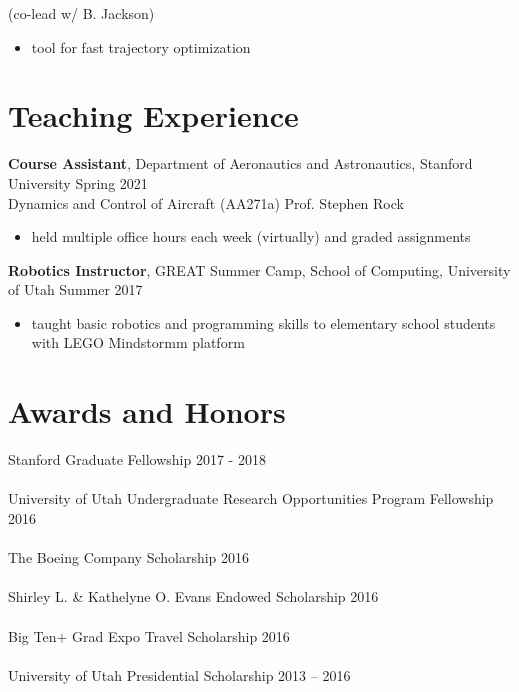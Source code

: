 \documentclass[10pt]{article}
\begin{document}
 (co-lead w/ B. Jackson) 
\begin{itemize}
\item  {\color{lightgray} tool for fast trajectory optimization}
\end{itemize}

\section*{Teaching Experience}
\textbf{Course Assistant}, Department of Aeronautics and Astronautics, Stanford University \hfill Spring 2021\\
{\color{lightgray} Dynamics and Control of Aircraft (AA271a) \hfill Prof. Stephen Rock} 
\begin{itemize}
    \item {\color{lightgray} held multiple office hours each week (virtually) and graded assignments}
\end{itemize}
\textbf{Robotics Instructor}, GREAT Summer Camp, School of Computing, University of Utah \hfill Summer 2017
\begin{itemize}
    \item {\color{lightgray} taught basic robotics and programming skills to elementary school students with LEGO Mindstormm platform}
\end{itemize}

\section*{Awards and Honors}
Stanford Graduate Fellowship \hfill  2017 - 2018
\\
\\
University of Utah Undergraduate Research Opportunities Program Fellowship \hfill 2016
\\
\\
The Boeing Company Scholarship \hfill 2016
\\
\\
Shirley L. \& Kathelyne O. Evans Endowed Scholarship \hfill 2016
\\
\\
Big Ten+ Grad Expo Travel Scholarship \hfill 2016
\\
\\
University of Utah Presidential Scholarship \hfill 2013 – 2016
\end{document}
